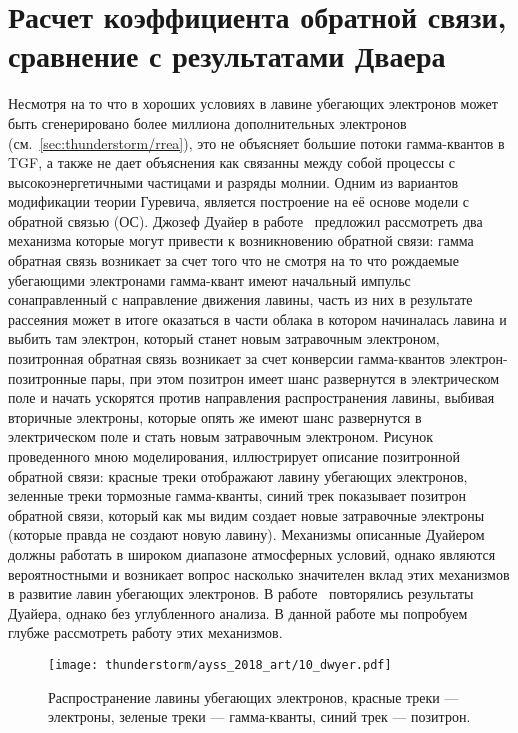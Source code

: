 \section{Расчет коэффициента обратной связи, сравнение с результатами Дваера}\label{sec:thunderstorm/rdfm}
Несмотря на то что в хороших условиях в лавине убегающих электронов может быть сгенерировано более миллиона дополнительных электронов (см.~\ref{sec:thunderstorm/rrea}), это не объясняет большие потоки гамма-квантов в TGF, а также не дает объяснения как связанны между собой процессы с высокоэнергетичными частицами и разряды молнии. Одним из вариантов модификации теории Гуревича, является построение на её основе модели с обратной связью (ОС). Джозеф Дуайер в работе~\cite{dwyer2003fundamental} предложил рассмотреть два механизма которые могут привести к возникновению обратной связи: гамма обратная связь возникает за счет того что не смотря на то что рождаемые убегающими электронами гамма-квант имеют начальный импульс сонаправленный с направление движения лавины, часть из них в результате рассеяния может в итоге оказаться в части облака в котором начиналась лавина и выбить там электрон, который станет новым затравочным электроном, позитронная обратная связь возникает за счет конверсии гамма-квантов электрон-позитронные пары, при этом позитрон имеет шанс развернутся в электрическом поле и начать ускорятся против направления распространения лавины, выбивая вторичные электроны, которые опять же имеют шанс развернутся в электрическом поле и стать новым затравочным электроном. Рисунок проведенного мною моделирования, иллюстрирует описание позитронной обратной связи: красные треки отображают лавину убегающих электронов, зеленные треки тормозные гамма-кванты, синий трек показывает позитрон обратной связи, который как мы видим создает новые затравочные электроны (которые правда не создают новую лавину). Механизмы описанные Дуайером должны работать в широком диапазоне атмосферных условий, однако являются вероятностными и возникает вопрос насколько значителен вклад этих механизмов в развитие лавин убегающих электронов. В работе~\cite{skeltved2014} повторялись результаты Дуайера, однако без углубленного анализа. В данной работе мы попробуем глубже рассмотреть работу этих механизмов.

\begin{figure}[ph!]
    \begin{center}
        \texttt{[image: thunderstorm/ayss\_2018\_art/10\_dwyer.pdf]}
        \caption{Распространение лавины убегающих электронов, красные треки --- электроны, зеленые треки --- гамма-кванты, синий трек --- позитрон.}
    \end{center}
    \label{fig:storm:dwyer}
\end{figure}


